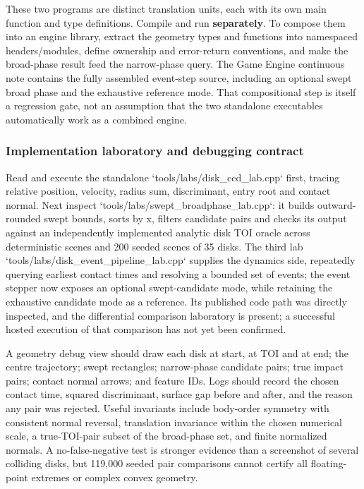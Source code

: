 These two programs are distinct translation units, each with its own main function and type definitions. Compile and run \textbf{separately}. To compose them into an engine library, extract the geometry types and functions into namespaced headers/modules, define ownership and error-return conventions, and make the broad-phase result feed the narrow-phase query. The Game Engine continuous note contains the fully assembled event-step source, including an optional swept broad phase and the exhaustive reference mode. That compositional step is itself a regression gate, not an assumption that the two standalone executables automatically work as a combined engine.

\subsubsection{Implementation laboratory and debugging contract}\label{04-visual-computing-ii-ch026-implementation-laboratory-and-debugging-contract}

Read and execute the standalone `tools/labs/disk\_ccd\_lab.cpp` first, tracing relative position, velocity, radius sum, discriminant, entry root and contact normal. Next inspect `tools/labs/swept\_broadphase\_lab.cpp`: it builds outward-rounded swept bounds, sorts by x, filters candidate pairs and checks its output against an independently implemented analytic disk TOI oracle across deterministic scenes and 200 seeded scenes of 35 disks. The third lab `tools/labs/disk\_event\_pipeline\_lab.cpp` supplies the dynamics side, repeatedly querying earliest contact times and resolving a bounded set of events; the event stepper now exposes an optional swept-candidate mode, while retaining the exhaustive candidate mode as a reference. Its published code path was directly inspected, and the differential comparison laboratory is present; a successful hosted execution of that comparison has not yet been confirmed.

A geometry debug view should draw each disk at start, at TOI and at end; the centre trajectory; swept rectangles; narrow-phase candidate pairs; true impact pairs; contact normal arrows; and feature IDs. Logs should record the chosen contact time, squared discriminant, surface gap before and after, and the reason any pair was rejected. Useful invariants include body-order symmetry with consistent normal reversal, translation invariance within the chosen numerical scale, a true-TOI-pair subset of the broad-phase set, and finite normalized normals. A no-false-negative test is stronger evidence than a screenshot of several colliding disks, but 119,000 seeded pair comparisons cannot certify all floating-point extremes or complex convex geometry.

